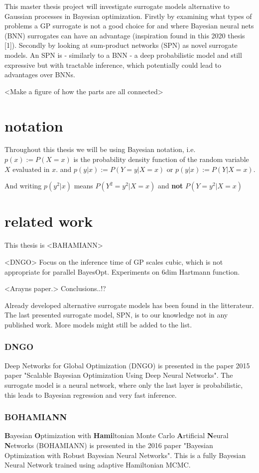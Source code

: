 This master thesis project will investigate surrogate models alternative to Gaussian processes in
Bayesian optimization. Firstly by examining what types of problems a GP surrogate is not a good
choice for and where Bayesian neural nets (BNN) surrogates can have an advantage (inspiration found in
this 2020 thesis [1]). Secondly by looking at sum-product networks (SPN) as novel surrogate models.
An SPN is - similarly to a BNN - a deep probabilistic model and still expressive but with tractable
inference, which potentially could lead to advantages over BNNs. 


<Make a figure of how the parts are all connected>

\section{notation}
Throughout this thesis we will be using Bayesian notation, i.e. $p(x) := P(X=x)$ is 
the probability density function of the random variable $X$ evaluated in $x$. 
and $p(y|x) := P(Y=y|X=x)$ or $p(y|x) := P(Y|X=x)$.

And writing $p(y^2|x)$ means $P(Y^2=y^2|X=x)$ and \textbf{not} $P(Y=y^2|X=x)$

\section{related work}
This thesis is 
<BAHAMIANN>

<DNGO>
Focus on the inference time of GP scales cubic, which is not appropriate for
parallel BayesOpt. 
Experiments on 6dim Hartmann function. 

<Arayns paper.>
Conclusions..!?

Already developed alternative surrogate models has been found in the litterateur. The last presented
surrogate model, SPN, is to our knowledge not in any published work. More models might still be
added to the list. 

\subsubsection*{DNGO}
Deep Networks for Global Optimization (DNGO) is presented in the paper 2015 paper "Scalable Bayesian
Optimization Using Deep Neural Networks"\cite{snoek2015scalable}. The surrogate model is a neural
network, where only the last layer is probabilistic, this leads to Bayesian regression and very fast
inference.  

\subsubsection*{BOHAMIANN}
\textbf{B}ayesian \textbf{O}ptimization with \textbf{Hami}ltonian Monte Carlo \textbf{A}rtificial
\textbf{N}eural \textbf{N}etworks (BOHAMIANN) is presented in the 2016 paper "Bayesian Optimization
with Robust Bayesian Neural Networks"\cite{NIPS2016_a96d3afe}. This is a fully Bayesian Neural
Network trained using adaptive Hamiltonian MCMC. 